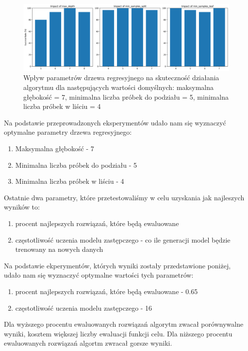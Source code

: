 \documentclass{article}
\begin{document}
\begin{figure}[H]
    \centering
    \includegraphics[width=\textwidth]{tree_parameter_tuning_separate_results3.png}
    \caption{Wpływ parametrów drzewa regresyjnego na skuteczność działania algorytmu dla następujących wartości domyślnych: maksymalna głębokość = 7, minimalna liczba próbek do podziału = 5, minimalna liczba próbek w liściu = 4}
    \label{fig:tree_parameter_results2}
\end{figure}

Na podstawie przeprowadzonych eksperymentów udało nam się wyznaczyć optymalne parametry drzewa regresyjnego:

\begin{enumerate}
    \item Maksymalna głębokość - 7
    \item Minimalna liczba próbek do podziału - 5
    \item Minimalna liczba próbek w liściu - 4
\end{enumerate}

Ostatnie dwa parametry, które przetestowaliśmy w celu uzyskania jak najleszych wyników to:
\begin{enumerate}
    \item procent najlepszych rozwiązań, które będą ewaluowane
    \item częstotliwość uczenia modelu zastępczego - co ile generacji model będzie trenowany na nowych danych
\end{enumerate}

Na podstawie ekperymentów, których wyniki zostały przedstawione poniżej, udało nam się wyznaczyć optymalne wartości tych parametrów:
\begin{enumerate}
    \item procent najlepszych rozwiązań, które będą ewaluowane - 0.65
    \item częstotliwość uczenia modelu zastępczego - 16
\end{enumerate}

Dla wyższego procentu ewaluowanych rozwiązań algorytm zwacał porównywalne wyniki, kosztem większej liczby ewaluacji funkcji celu. Dla niższego procentu ewaluowanych rozwiązań algortm zwracał gorsze wyniki.
\end{document}
